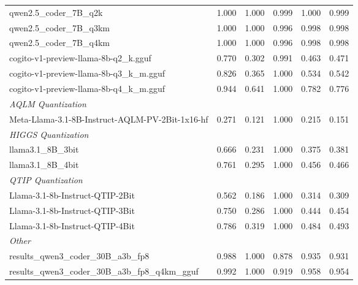 \begin{table}[htbp]
{\begin{tabular}{lrrrrr}
    qwen2.5\_coder\_7B\_q2k & 1.000 & 1.000 & 0.999 & 1.000 & \cellcolor{green!50}0.999 \\
    qwen2.5\_coder\_7B\_q3km & 1.000 & 1.000 & 0.996 & 0.998 & \cellcolor{green!30}0.998 \\
    qwen2.5\_coder\_7B\_q4km & 1.000 & 1.000 & 0.996 & 0.998 & \cellcolor{green!20}0.998 \\
    cogito-v1-preview-llama-8b-q2\_k.gguf & 0.770 & 0.302 & 0.991 & 0.463 & 0.471 \\
    cogito-v1-preview-llama-8b-q3\_k\_m.gguf & 0.826 & 0.365 & 1.000 & 0.534 & 0.542 \\
    cogito-v1-preview-llama-8b-q4\_k\_m.gguf & 0.944 & 0.641 & 1.000 & 0.782 & 0.776 \\
    \midrule
    \multicolumn{6}{l}{\textit{AQLM Quantization}} \\
    \midrule
    Meta-Llama-3.1-8B-Instruct-AQLM-PV-2Bit-1x16-hf & 0.271 & 0.121 & 1.000 & 0.215 & 0.151 \\
    \midrule
    \multicolumn{6}{l}{\textit{HIGGS Quantization}} \\
    \midrule
    llama3.1\_8B\_3bit & 0.666 & 0.231 & 1.000 & 0.375 & 0.381 \\
    llama3.1\_8B\_4bit & 0.761 & 0.295 & 1.000 & 0.456 & 0.466 \\
    \midrule
    \multicolumn{6}{l}{\textit{QTIP Quantization}} \\
    \midrule
    Llama-3.1-8b-Instruct-QTIP-2Bit & 0.562 & 0.186 & 1.000 & 0.314 & 0.309 \\
    Llama-3.1-8b-Instruct-QTIP-3Bit & 0.750 & 0.286 & 1.000 & 0.444 & 0.454 \\
    Llama-3.1-8b-Instruct-QTIP-4Bit & 0.786 & 0.319 & 1.000 & 0.484 & 0.493 \\
    \midrule
    \multicolumn{6}{l}{\textit{Other}} \\
    \midrule
    results\_qwen3\_coder\_30B\_a3b\_fp8 & 0.988 & 1.000 & 0.878 & 0.935 & 0.931 \\
    results\_qwen3\_coder\_30B\_a3b\_fp8\_q4km\_gguf & 0.992 & 1.000 & 0.919 & 0.958 & \cellcolor{green!10}0.954 \\
    \bottomrule
  \end{tabular}
  }
\end{table}

